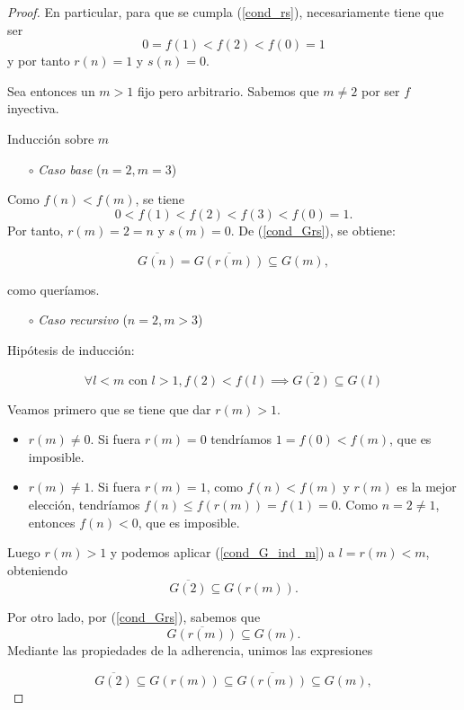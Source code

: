 \documentclass{article}
\newcommand{\refpep}[1]{(\ref{#1})}
\begin{document}
\begin{proof}
En particular, para que se cumpla \refpep{cond_rs}, necesariamente tiene que ser $$0 = f(1) < f(2) < f(0) = 1$$ y por tanto $r(n) = 1$ y $s(n) = 0.$

Sea entonces un $m > 1$ fijo pero arbitrario. Sabemos que $m \neq 2$ por ser $f$ inyectiva.

Inducción sobre $m$

\begin{itemize}
  \setlength{\itemindent}{2em}
  \item[$\circ$] \textit{Caso base} ($n = 2, m= 3$)
\end{itemize}

Como $f(n) < f(m)$, se tiene $$0 < f(1) < f(2) < f(3) < f(0) = 1.$$ Por tanto, $r(m) = 2 = n$ y $s(m) = 0$. De \refpep{cond_Grs}, se obtiene:

$$
\overline{G(n)} = \overline{G(r(m))} \subseteq G(m),
$$

como queríamos.

\begin{itemize}
  \setlength{\itemindent}{2em}
  \item[$\circ$] \textit{Caso recursivo} ($n = 2, m>3$)
\end{itemize}

Hipótesis de inducción:

\begin{equation} \label{cond_G_ind_m}
  \forall l < m \text{ con } l > 1, f(2) < f(l) \implies \overline{G(2)} \subseteq G(l)
\end{equation}

Veamos primero que se tiene que dar $r(m) > 1$.

\begin{itemize}
  \item $r(m) \neq 0$. Si fuera $r(m) = 0$ tendríamos $1 = f(0) < f(m)$, que es imposible.
  \item $r(m) \neq 1$. Si fuera $r(m) = 1$, como $f(n) < f(m)$ y $r(m)$ es la mejor elección, tendríamos $f(n) \leq f(r(m)) = f(1) = 0$. Como $n=2\neq 1$, entonces $f(n) < 0$, que es imposible.
\end{itemize}


Luego $r(m)> 1$ y podemos aplicar \refpep{cond_G_ind_m} a $l=r(m)<m$, obteniendo $$\overline{G(2)} \subseteq G(r(m)).$$

Por otro lado, por \refpep{cond_Grs}, sabemos que $$\overline{G(r(m))} \subseteq G(m).$$ Mediante las propiedades de la adherencia, unimos las expresiones

$$
\overline{G(2)} \subseteq G(r(m)) \subseteq \overline{G(r(m))} \subseteq G(m),
$$


\end{proof}
\end{document}
